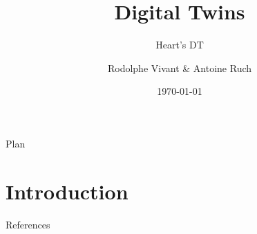 \documentclass{beamer}
\title{Digital Twins}
\subtitle{Heart's DT}
\author{Rodolphe Vivant \& Antoine Ruch}
\institute{UFR of Mathematics and Informatics}
\date{\today}
\begin{document}
\begin{frame}
  \titlepage
\end{frame}

\begin{frame}{Plan}
  \tableofcontents
\end{frame}

\section{Introduction}

\begin{frame}{References}
    \printbibliography
\end{frame}
\end{document}
